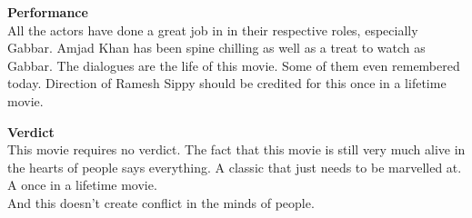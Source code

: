 \begin{flushleft}
\textbf{Performance}\\
All the actors have done a great job in in their respective roles, especially Gabbar. Amjad Khan has been spine chilling as well as a treat to watch as Gabbar. The dialogues are the life of this movie. Some of them even remembered today. Direction of Ramesh Sippy should be credited for this once in a lifetime movie.\\ 
\vspace{3mm}

\textbf{Verdict}\\
This movie requires no verdict. The fact that this movie is still very much alive in the hearts of people says everything. A classic that just needs to be marvelled at. A once in a lifetime movie.\\
And this doesn't create conflict in the minds of people.\\
\end{flushleft}

